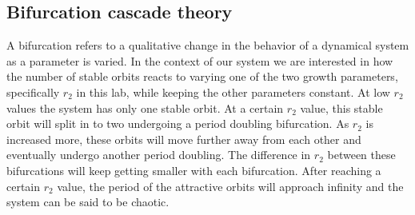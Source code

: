 \subsection{Bifurcation cascade theory}
A bifurcation refers to a qualitative change in the behavior of a dynamical system as a parameter is varied.
In the context of our system we are interested in how the number of stable orbits reacts to varying one of the two growth parameters, specifically $r_2$ in this lab, while keeping the other parameters constant.
At low $r_2$ values the system has only one stable orbit.
At a certain $r_2$ value, this stable orbit will split in to two undergoing a period doubling bifurcation.
As $r_2$ is increased more, these orbits will move further away from each other and eventually undergo another period doubling.
The difference in $r_2$ between these bifurcations will keep getting smaller with each bifurcation.
After reaching a certain $r_2$ value, the period of the attractive orbits will approach infinity and the system can be said to be chaotic. 